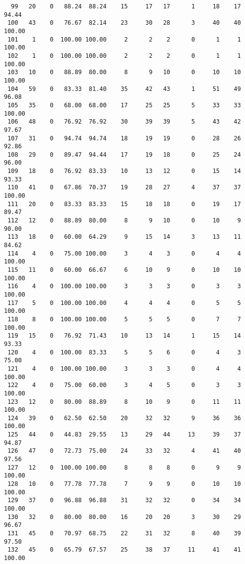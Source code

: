 \begin{verbatim}
  99   20    0   88.24  88.24    15     17   17      1     18    17    94.44
 100   43    0   76.67  82.14    23     30   28      3     40    40   100.00
 101    1    0  100.00 100.00     2      2    2      0      1     1   100.00
 102    1    0  100.00 100.00     2      2    2      0      1     1   100.00
 103   10    0   88.89  80.00     8      9   10      0     10    10   100.00
 104   59    0   83.33  81.40    35     42   43      1     51    49    96.08
 105   35    0   68.00  68.00    17     25   25      5     33    33   100.00
 106   48    0   76.92  76.92    30     39   39      5     43    42    97.67
 107   31    0   94.74  94.74    18     19   19      0     28    26    92.86
 108   29    0   89.47  94.44    17     19   18      0     25    24    96.00
 109   18    0   76.92  83.33    10     13   12      0     15    14    93.33
 110   41    0   67.86  70.37    19     28   27      4     37    37   100.00
 111   20    0   83.33  83.33    15     18   18      0     19    17    89.47
 112   12    0   88.89  80.00     8      9   10      0     10     9    90.00
 113   18    0   60.00  64.29     9     15   14      3     13    11    84.62
 114    4    0   75.00 100.00     3      4    3      0      4     4   100.00
 115   11    0   60.00  66.67     6     10    9      0     10    10   100.00
 116    4    0  100.00 100.00     3      3    3      0      3     3   100.00
 117    5    0  100.00 100.00     4      4    4      0      5     5   100.00
 118    8    0  100.00 100.00     5      5    5      0      7     7   100.00
 119   15    0   76.92  71.43    10     13   14      1     15    14    93.33
 120    4    0  100.00  83.33     5      5    6      0      4     3    75.00
 121    4    0  100.00 100.00     3      3    3      0      4     4   100.00
 122    4    0   75.00  60.00     3      4    5      0      3     3   100.00
 123   12    0   80.00  88.89     8     10    9      0     11    11   100.00
 124   39    0   62.50  62.50    20     32   32      9     36    36   100.00
 125   44    0   44.83  29.55    13     29   44     13     39    37    94.87
 126   47    0   72.73  75.00    24     33   32      4     41    40    97.56
 127   12    0  100.00 100.00     8      8    8      0      9     9   100.00
 128   10    0   77.78  77.78     7      9    9      0     10    10   100.00
 129   37    0   96.88  96.88    31     32   32      0     34    34   100.00
 130   32    0   80.00  80.00    16     20   20      3     30    29    96.67
 131   45    0   70.97  68.75    22     31   32      8     40    39    97.50
 132   45    0   65.79  67.57    25     38   37     11     41    41   100.00

\end{verbatim}
